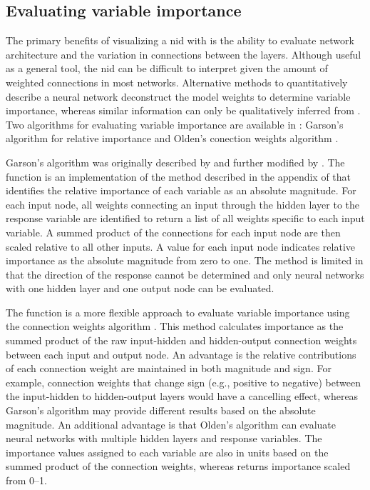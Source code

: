 \documentclass[article,shortnames]{jss}\usepackage[]{graphicx}\usepackage[]{color}
\begin{document}
\subsection{Evaluating variable importance}

The primary benefits of visualizing a \ac{nid} with  is the ability to evaluate network architecture and the variation in connections between the layers.  Although useful as a general tool, the \ac{nid} can be difficult to interpret given the amount of weighted connections in most networks.  Alternative methods to quantitatively describe a neural network deconstruct the model weights to determine variable importance, whereas similar information can only be qualitatively inferred from .  Two algorithms for evaluating variable importance are available in : Garson's algorithm for relative importance \citep{Garson91,Goh95} and Olden's conection weights algorithm \citep{Olden04}.

Garson's algorithm was originally described by \citet{Garson91} and further modified by \citet{Goh95}.  The  function is an implementation of the method described in the appendix of \citet{Goh95} that identifies the relative importance of each variable as an absolute magnitude. For each input node, all weights connecting an input through the hidden layer to the response variable are identified to return a list of all weights specific to each input variable. A summed product of the connections for each input node are then scaled relative to all other inputs. A value for each input node indicates relative importance as the absolute magnitude from zero to one. The method is limited in that the direction of the response cannot be determined and only neural networks with one hidden layer and one output node can be evaluated.

The  function is a more flexible approach to evaluate variable importance using the connection weights algorithm \citep{Olden04}. This method calculates importance as the summed product of the raw input-hidden and hidden-output connection weights between each input and output node. An advantage is the relative contributions of each connection weight are maintained in both magnitude and sign. For example, connection weights that change sign (e.g., positive to negative) between the input-hidden to hidden-output layers would have a cancelling effect, whereas Garson's algorithm may provide different results based on the absolute magnitude. An additional advantage is that Olden's algorithm can evaluate neural networks with multiple hidden layers and response variables. The importance values assigned to each variable are also in units based on the summed product of the connection weights, whereas  returns importance scaled from 0--1.
\end{document}
